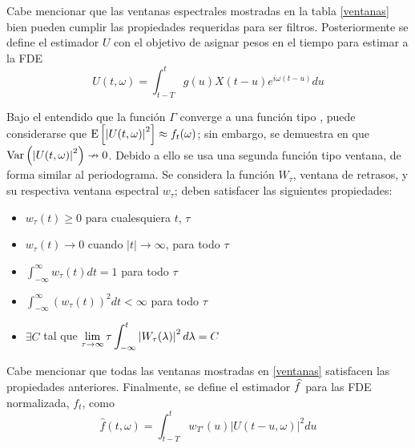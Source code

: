 Cabe mencionar que las ventanas espectrales mostradas en la tabla \ref{ventanas} bien 
pueden cumplir las propiedades requeridas para ser filtros.
Posteriormente se define el estimador $U$ con el objetivo de asignar pesos en el tiempo para estimar
a la FDE
\begin{equation*}
U(t,\omega) = \int_{t-T}^{t} g(u) X({t-u}) e^{i \omega (t-u)} du
\end{equation*}

Bajo el entendido que la funci\'on $\Gamma$ converge a una funci\'on tipo \dirac, puede 
considerarse que 
$\mathrm{E}\left[ \left| U(t,\omega) \right|^{2} \right] \approx f_t(\omega)$; sin embargo, se demuestra en \cite{Priestley66} 
que $\mathrm{Var}\left( \left| U(t,\omega) \right|^{2} \right) \nrightarrow 0$.
%
Debido a ello se usa una segunda funci\'on tipo ventana,
de forma similar al periodograma.
Se considera la funci\'on $W_\tau$, ventana de retrasos, y su respectiva ventana espectral 
$w_\tau$; deben satisfacer las siguientes propiedades:
\begin{itemize}
\item $w_{\tau}(t) \geq 0$ para cualesquiera $t$, $\tau$
\item $w_{\tau}(t) \rightarrow 0$ cuando $\lvert t \lvert \rightarrow \infty$, para todo $\tau$
\item $\displaystyle \int_{-\infty}^{\infty} w_{\tau}(t) dt = 1$ para todo $\tau$
\item $\displaystyle \int_{-\infty}^{\infty} \left( w_{\tau}(t) \right)^{2} dt < \infty$ para todo $\tau$
\item $\exists C$ tal que  
$\displaystyle \lim_{\tau\rightarrow\infty} \tau \int_{-\infty}^{t} \left|  W_{\tau}(\lambda)  \right|^{2} d\lambda = C$
\end{itemize}

Cabe mencionar que todas las ventanas mostradas en \ref{ventanas} satisfacen las propiedades 
anteriores.
Finalmente, se define el estimador $\widehat{ f }$ para las FDE normalizada, $f_t$, como
\begin{equation*}
\widehat{f}(t,\omega) = \int_{t-T}^{t} w_{T'}(u) \lvert U(t-u,\omega) \lvert^{2} du
\label{estimador_doble_ventana}
\end{equation*}

